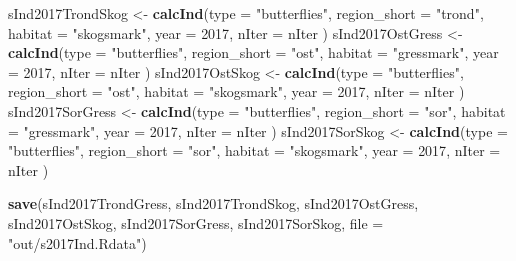 \documentclass[]{article}
\newenvironment{Shaded}{\begin{snugshade}}{\end{snugshade}}
\newcommand{\KeywordTok}[1]{\textcolor[rgb]{0.13,0.29,0.53}{\textbf{#1}}}
\newcommand{\DataTypeTok}[1]{\textcolor[rgb]{0.13,0.29,0.53}{#1}}
\newcommand{\DecValTok}[1]{\textcolor[rgb]{0.00,0.00,0.81}{#1}}
\newcommand{\StringTok}[1]{\textcolor[rgb]{0.31,0.60,0.02}{#1}}
\newcommand{\NormalTok}[1]{#1}
\begin{document}
\begin{Shaded}
\begin{Highlighting}[]
\NormalTok{sInd2017TrondSkog <-}\StringTok{ }\KeywordTok{calcInd}\NormalTok{(}\DataTypeTok{type =} \StringTok{"butterflies"}\NormalTok{,}
                              \DataTypeTok{region_short =} \StringTok{"trond"}\NormalTok{,}
                              \DataTypeTok{habitat =} \StringTok{"skogsmark"}\NormalTok{,}
                              \DataTypeTok{year =} \DecValTok{2017}\NormalTok{,}
                              \DataTypeTok{nIter =}\NormalTok{ nIter}
\NormalTok{                              )}
\NormalTok{sInd2017OstGress <-}\StringTok{ }\KeywordTok{calcInd}\NormalTok{(}\DataTypeTok{type =} \StringTok{"butterflies"}\NormalTok{,}
                              \DataTypeTok{region_short =} \StringTok{"ost"}\NormalTok{,}
                              \DataTypeTok{habitat =} \StringTok{"gressmark"}\NormalTok{,}
                              \DataTypeTok{year =} \DecValTok{2017}\NormalTok{,}
                              \DataTypeTok{nIter =}\NormalTok{ nIter}
\NormalTok{                              )}
\NormalTok{sInd2017OstSkog <-}\StringTok{ }\KeywordTok{calcInd}\NormalTok{(}\DataTypeTok{type =} \StringTok{"butterflies"}\NormalTok{,}
                              \DataTypeTok{region_short =} \StringTok{"ost"}\NormalTok{,}
                              \DataTypeTok{habitat =} \StringTok{"skogsmark"}\NormalTok{,}
                              \DataTypeTok{year =} \DecValTok{2017}\NormalTok{,}
                              \DataTypeTok{nIter =}\NormalTok{ nIter}
\NormalTok{                              )}
\NormalTok{sInd2017SorGress <-}\StringTok{ }\KeywordTok{calcInd}\NormalTok{(}\DataTypeTok{type =} \StringTok{"butterflies"}\NormalTok{,}
                              \DataTypeTok{region_short =} \StringTok{"sor"}\NormalTok{,}
                              \DataTypeTok{habitat =} \StringTok{"gressmark"}\NormalTok{,}
                              \DataTypeTok{year =} \DecValTok{2017}\NormalTok{,}
                              \DataTypeTok{nIter =}\NormalTok{ nIter}
\NormalTok{                              )}
\NormalTok{sInd2017SorSkog <-}\StringTok{ }\KeywordTok{calcInd}\NormalTok{(}\DataTypeTok{type =} \StringTok{"butterflies"}\NormalTok{,}
                              \DataTypeTok{region_short =} \StringTok{"sor"}\NormalTok{,}
                              \DataTypeTok{habitat =} \StringTok{"skogsmark"}\NormalTok{,}
                              \DataTypeTok{year =} \DecValTok{2017}\NormalTok{,}
                              \DataTypeTok{nIter =}\NormalTok{ nIter}
\NormalTok{                              )}

\KeywordTok{save}\NormalTok{(sInd2017TrondGress, sInd2017TrondSkog, sInd2017OstGress, sInd2017OstSkog, sInd2017SorGress, sInd2017SorSkog, }\DataTypeTok{file =} \StringTok{"out/s2017Ind.Rdata"}\NormalTok{)}
\end{Highlighting}
\end{Shaded}
\end{document}
